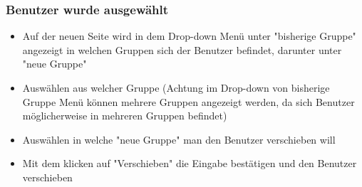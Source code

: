 \subsubsection*{Benutzer wurde ausgewählt}
\begin{itemize}
	\item Auf der neuen Seite wird in dem Drop-down Menü unter "bisherige Gruppe" angezeigt in welchen Gruppen sich der Benutzer befindet, darunter unter "neue Gruppe" 
	\item Auswählen aus welcher Gruppe (Achtung im Drop-down von bisherige Gruppe Menü können mehrere Gruppen angezeigt werden, da sich Benutzer möglicherweise in mehreren Gruppen befindet)
	\item Auswählen in welche "neue Gruppe" man den Benutzer verschieben will
	\item Mit dem klicken auf "Verschieben" die Eingabe bestätigen und den Benutzer verschieben
\end{itemize}


\clearpage